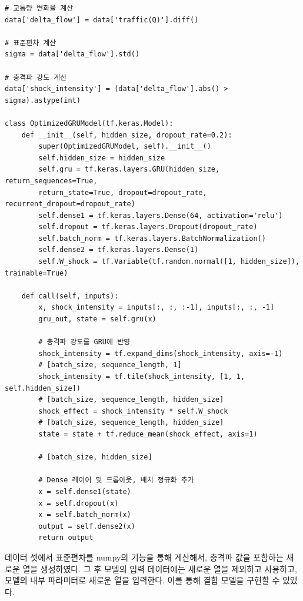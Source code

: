 \documentclass[11pt]{report}
\begin{document}
\begin{scriptsize}  %
\begin{verbatim}
# 교통량 변화율 계산
data['delta_flow'] = data['traffic(Q)'].diff()

# 표준편차 계산
sigma = data['delta_flow'].std()

# 충격파 강도 계산
data['shock_intensity'] = (data['delta_flow'].abs() > sigma).astype(int)

class OptimizedGRUModel(tf.keras.Model):
    def __init__(self, hidden_size, dropout_rate=0.2):
        super(OptimizedGRUModel, self).__init__()
        self.hidden_size = hidden_size
        self.gru = tf.keras.layers.GRU(hidden_size, return_sequences=True, 
		return_state=True, dropout=dropout_rate, recurrent_dropout=dropout_rate)
        self.dense1 = tf.keras.layers.Dense(64, activation='relu')
        self.dropout = tf.keras.layers.Dropout(dropout_rate)
        self.batch_norm = tf.keras.layers.BatchNormalization()
        self.dense2 = tf.keras.layers.Dense(1)
        self.W_shock = tf.Variable(tf.random.normal([1, hidden_size]), trainable=True)

    def call(self, inputs):
        x, shock_intensity = inputs[:, :, :-1], inputs[:, :, -1]
        gru_out, state = self.gru(x)

        # 충격파 강도를 GRU에 반영
        shock_intensity = tf.expand_dims(shock_intensity, axis=-1)  
		# [batch_size, sequence_length, 1]
        shock_intensity = tf.tile(shock_intensity, [1, 1, self.hidden_size])  
		# [batch_size, sequence_length, hidden_size]
        shock_effect = shock_intensity * self.W_shock  
		# [batch_size, sequence_length, hidden_size]
        state = state + tf.reduce_mean(shock_effect, axis=1)  
		
		# [batch_size, hidden_size]

        # Dense 레이어 및 드롭아웃, 배치 정규화 추가
        x = self.dense1(state)
        x = self.dropout(x)
        x = self.batch_norm(x)
        output = self.dense2(x)
        return output
\end{verbatim}
\end{scriptsize}

\indent 데이터 셋에서 표준편차를 numpy의 기능을 통해 계산해서, 충격파 값을 포함하는 새로운 열을 생성하였다. 
그 후 모델의 입력 데이터에는 새로운 열을 제외하고 사용하고, 모델의 내부 파라미터로 새로운 열을 입력한다. 
이를 통해 결합 모델을 구현할 수 있었다. 
\end{document}
